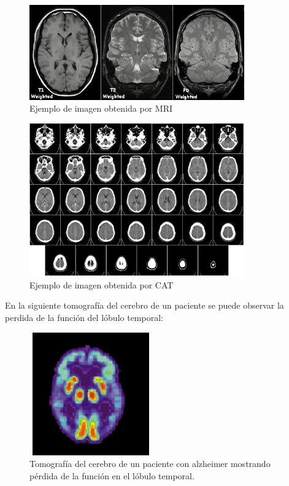 \begin{figure}[H]
	\label{mriscan}
	\caption{Ejemplo de imagen obtenida por MRI}
	\centering
	\includegraphics[width=350px]{imagenes/mriscanexample.jpg}
\end{figure}
\begin{figure}[H]
	\label{catscan}
	\caption{Ejemplo de imagen obtenida por CAT}
	\centering
	\includegraphics[width=350px]{imagenes/catimage.png}
\end{figure}
\newpage

En la siguiente tomografía del cerebro de un paciente se puede observar la perdida de la función del lóbulo temporal:

\begin{figure}[H]
	\label{perdidaLT}
	\caption{Tomografía del cerebro de un paciente con alzheimer mostrando pérdida de la función en el lóbulo temporal.}
	\centering
	\includegraphics[height=200px,width=200px]{imagenes/perdidaLT.jpg}
\end{figure}


